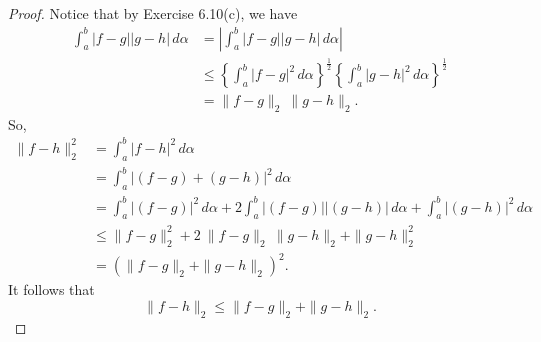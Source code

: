 \begin{Exercise}
	\begin{proof}
		Notice that by Exercise 6.10(c), we have
		\begin{align*}
		\int_{a}^{b}|f-g| |g-h|\,d\alpha
		&= \left| \int_{a}^{b}|f-g| |g-h|\,d\alpha \right| \\
		&\leq \left\{ \int_{a}^{b} |f-g|^2\,d\alpha \right\}^{\frac{1}{2}} \left\{ \int_{a}^{b} |g-h|^2\,d\alpha \right\}^{\frac{1}{2}} \\
		&= \| f-g \|_2~\|g-h\|_2.
		\end{align*}
		So,
		\begin{align*}
		\|f-h\|^2_2
		&= \int_{a}^{b} |f-h|^2\,d\alpha \\
		&= \int_{a}^{b} |(f-g)+(g-h)|^2\,d\alpha \\
		&= \int_{a}^{b} |(f-g)|^2\,d\alpha + 2\int_{a}^{b} |(f-g)| |(g-h)|\,d\alpha+ \int_{a}^{b}|(g-h)|^2\,d\alpha \\
		&\leq \|f-g\|^2_2 + 2~\|f-g\|_2~\|g-h\|_2 + \|g-h\|^2_2 \\
		&= (\|f-g\|_2 + \|g-h\|_2)^2.
		\end{align*}
		It follows that
		$$
		\|f-h\|_2 \leq \|f-g\|_2 + \|g-h\|_2.
		$$
	\end{proof}
\end{Exercise}